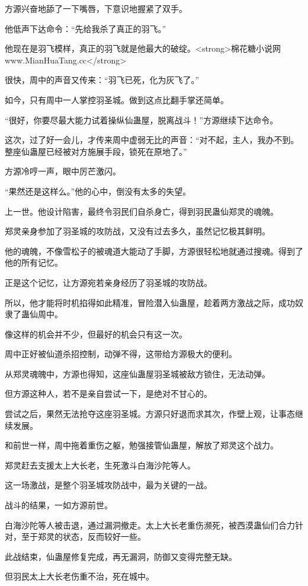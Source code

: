 \begin{this_body}
方源兴奋地舔了一下嘴唇，下意识地握紧了双手。

他低声下达命令：“先给我杀了真正的羽飞。”

他现在是羽飞模样，真正的羽飞就是他最大的破绽。<strong>棉花糖小说网www.MianHuaTang.cc</strong>

很快，周中的声音又传来：“羽飞已死，化为灰飞了。”

如今，只有周中一人掌控羽圣城。做到这点比翻手掌还简单。

“很好，你要尽最大能力试着操纵仙蛊屋，脱离战斗！”方源继续下达命令。

这次，过了好一会儿，才传来周中虚弱无比的声音：“对不起，主人，我办不到。整座仙蛊屋已经被对方施展手段，锁死在原地了。”

方源冷哼一声，眼中厉芒激闪。

“果然还是这样么。”他的心中，倒没有太多的失望。

上一世。他设计陷害，最终令羽民们自杀身亡，得到羽民蛊仙郑灵的魂魄。

郑灵亲身参加了羽圣城的攻防战，又没有过去多久，虽然记忆极其鲜明。

他的魂魄，不像雪松子的被魂道大能动了手脚，方源很轻松地就通过搜魂。得到了他的所有记忆。

正是这个记忆，让方源宛若亲身经历了羽圣城的攻防战。

所以，他才能将时机掐得如此精准，冒险潜入仙蛊屋，趁着两方激战之际，成功奴隶了蛊仙周中。

像这样的机会并不少，但最好的机会只有这一次。

周中正好被仙道杀招控制，动弹不得，这带给方源极大的便利。

从郑灵魂魄中，方源也得知，这座仙蛊屋羽圣城被敌方锁住，无法动弹。

但方源这种人，若不是亲自尝试一下，是绝对不甘心的。

尝试之后，果然无法抢夺这座羽圣城。方源只好退而求其次，作壁上观，让事态继续发展。

和前世一样，周中拖着重伤之躯，勉强接管仙蛊屋，解放了郑灵这个战力。

郑灵赶去支援太上大长老，生死激斗白海沙陀等人。

这一场激战，是整个羽圣城攻防战中，最为关键的一战。

战斗的结果，一如方源前世。

白海沙陀等人被击退，通过漏洞撤走。太上大长老重伤濒死，被西漠蛊仙们合力针对，至于郑灵的状态，反而较好一些。

此战结束，仙蛊屋修复完成，再无漏洞，防御又变得完整无缺。

但羽民太上大长老伤重不治，死在城中。


\end{this_body}
